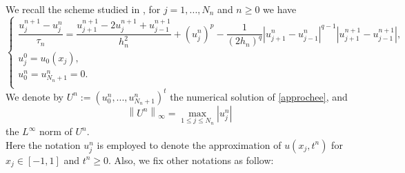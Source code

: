 \documentclass[a4paper,12pt,english,reqno]{smfart}
\begin{document}
	\noindent We recall the scheme studied in \cite{hani}, for $j=1,...,N_{n}$ and $n\geq 0$ we have
		\begin{equation}
		\left\{ 
		\begin{array}{lllll}
		\dfrac{u_{j}^{n+1}-u_{j}^{n}}{\tau_{n}}=\dfrac{u_{j+1}^{n+1}-2u_{j}^{n+1}+u_{j-1}^{n+1}}{h_{n}^{2}}+(u_{j}^{n})^{p}-\dfrac{1}{(2h_{n})^{q}}\left| u_{j+1}^{n}-u_{j-1}^{n}\right| ^{q-1}\left| u_{j+1}^{n+1}-u_{j-1}^{n+1}\right| ,\\
		u_{j}^{0}=u_{0}(x_{j}),\\
		u_{0}^{n}=u_{N_{n}+1}^{n}=0.\\
		\end{array}
		\right.
		\label{approchee}
		\end{equation}
	\noindent We denote by $U^{n}:=(u_{0}^{n},...,u_{N_{n}+1}^{n})^{t}$ the numerical solution of \eqref{approchee}, and $$\left\|U^{n}\right\|_{\infty}=\max\limits_{1\leq j\leq N_{n}}|u_{j}^{n}|$$ the $L^{\infty}$ norm of $U^{n}$.\\
	Here the notation $u_{j}^{n}$ is employed to denote the approximation of $u(x_{j},t^{n})$ for $x_{j}\in [-1,1]$ and $t^{n}\geq 0.$ Also, we fix other notations as follow:
\end{document}
